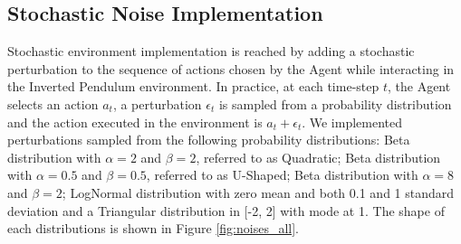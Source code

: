        \subsection{Stochastic Noise Implementation}
        \label{sub:stoch_noise_impl}
            Stochastic environment implementation is reached by adding a stochastic perturbation to the sequence of actions chosen by the Agent while interacting in the Inverted Pendulum environment. In practice, at each time-step $t$, the Agent selects an action $a_t$, a perturbation $\epsilon_t$ is sampled from a probability distribution and the action executed in the environment is $a_t + \epsilon_t$. We implemented perturbations sampled from the following probability distributions: Beta distribution with $\alpha=2$ and $\beta=2$, referred to as Quadratic; Beta distribution with $\alpha=0.5$ and $\beta=0.5$, referred to as U-Shaped; Beta distribution with $\alpha=8$ and $\beta=2$; LogNormal distribution with zero mean and both 0.1 and 1 standard deviation and a Triangular distribution in [-2, 2] with mode at 1. The shape of each distributions is shown in Figure \ref{fig:noises_all}.
        
